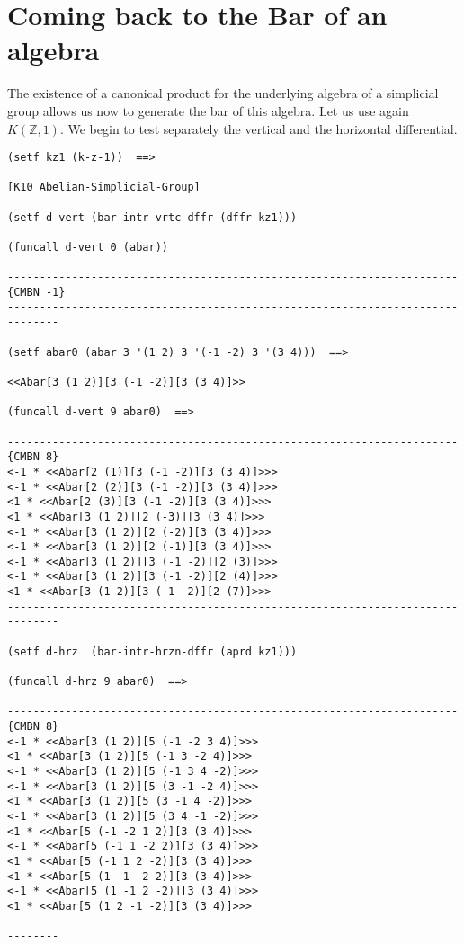 \section {Coming back to the Bar of an algebra}

The existence of a canonical product for the underlying algebra of a simplicial group
allows us now to generate the bar of this algebra. Let us use again $K(\mathbb{Z}, 1).$
We begin to test separately the vertical and the horizontal differential.
{\footnotesize\begin{verbatim}
(setf kz1 (k-z-1))  ==>

[K10 Abelian-Simplicial-Group]

(setf d-vert (bar-intr-vrtc-dffr (dffr kz1)))

(funcall d-vert 0 (abar))

----------------------------------------------------------------------{CMBN -1}
------------------------------------------------------------------------------

(setf abar0 (abar 3 '(1 2) 3 '(-1 -2) 3 '(3 4)))  ==>

<<Abar[3 (1 2)][3 (-1 -2)][3 (3 4)]>>

(funcall d-vert 9 abar0)  ==>

----------------------------------------------------------------------{CMBN 8}
<-1 * <<Abar[2 (1)][3 (-1 -2)][3 (3 4)]>>>
<-1 * <<Abar[2 (2)][3 (-1 -2)][3 (3 4)]>>>
<1 * <<Abar[2 (3)][3 (-1 -2)][3 (3 4)]>>>
<1 * <<Abar[3 (1 2)][2 (-3)][3 (3 4)]>>>
<-1 * <<Abar[3 (1 2)][2 (-2)][3 (3 4)]>>>
<-1 * <<Abar[3 (1 2)][2 (-1)][3 (3 4)]>>>
<-1 * <<Abar[3 (1 2)][3 (-1 -2)][2 (3)]>>>
<-1 * <<Abar[3 (1 2)][3 (-1 -2)][2 (4)]>>>
<1 * <<Abar[3 (1 2)][3 (-1 -2)][2 (7)]>>>
------------------------------------------------------------------------------

(setf d-hrz  (bar-intr-hrzn-dffr (aprd kz1)))

(funcall d-hrz 9 abar0)  ==>

----------------------------------------------------------------------{CMBN 8}
<-1 * <<Abar[3 (1 2)][5 (-1 -2 3 4)]>>>
<1 * <<Abar[3 (1 2)][5 (-1 3 -2 4)]>>>
<-1 * <<Abar[3 (1 2)][5 (-1 3 4 -2)]>>>
<-1 * <<Abar[3 (1 2)][5 (3 -1 -2 4)]>>>
<1 * <<Abar[3 (1 2)][5 (3 -1 4 -2)]>>>
<-1 * <<Abar[3 (1 2)][5 (3 4 -1 -2)]>>>
<1 * <<Abar[5 (-1 -2 1 2)][3 (3 4)]>>>
<-1 * <<Abar[5 (-1 1 -2 2)][3 (3 4)]>>>
<1 * <<Abar[5 (-1 1 2 -2)][3 (3 4)]>>>
<1 * <<Abar[5 (1 -1 -2 2)][3 (3 4)]>>>
<-1 * <<Abar[5 (1 -1 2 -2)][3 (3 4)]>>>
<1 * <<Abar[5 (1 2 -1 -2)][3 (3 4)]>>>
------------------------------------------------------------------------------
\end{verbatim}}
